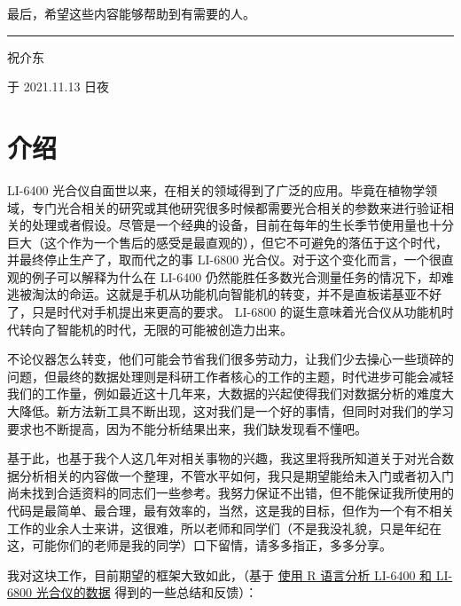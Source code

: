 \documentclass[
  letterpaper,
  DIV=11]{scrreport}
\begin{document}
最后，希望这些内容能够帮助到有需要的人。

\begin{center}\rule{0.5\linewidth}{0.5pt}\end{center}

祝介东

于 2021.11.13 日夜

\hypertarget{Introduction}{%
\chapter*{介绍}\label{Introduction}}

LI-6400
光合仪自面世以来，在相关的领域得到了广泛的应用。毕竟在植物学领域，专门光合相关的研究或其他研究很多时候都需要光合相关的参数来进行验证相关的处理或者假设。尽管是一个经典的设备，目前在每年的生长季节使用量也十分巨大（这个作为一个售后的感受是最直观的），但它不可避免的落伍于这个时代，并最终停止生产了，取而代之的事
LI-6800 光合仪。对于这个变化而言，一个很直观的例子可以解释为什么在
LI-6400
仍然能胜任多数光合测量任务的情况下，却难逃被淘汰的命运。这就是手机从功能机向智能机的转变，并不是直板诺基亚不好了，只是时代对手机提出来更高的要求。
LI-6800
的诞生意味着光合仪从功能机时代转向了智能机的时代，无限的可能被创造力出来。

不论仪器怎么转变，他们可能会节省我们很多劳动力，让我们少去操心一些琐碎的问题，但最终的数据处理则是科研工作者核心的工作的主题，时代进步可能会减轻我们的工作量，例如最近这十几年来，大数据的兴起使得我们对数据分析的难度大大降低。新方法新工具不断出现，这对我们是一个好的事情，但同时对我们的学习要求也不断提高，因为不能分析结果出来，我们缺发现看不懂吧。

基于此，也基于我个人这几年对相关事物的兴趣，我这里将我所知道关于对光合数据分析相关的内容做一个整理，不管水平如何，我只是期望能给未入门或者初入门尚未找到合适资料的同志们一些参考。我努力保证不出错，但不能保证我所使用的代码是最简单、最合理，最有效率的，当然，这是我的目标，但作为一个有不相关工作的业余人士来讲，这很难，所以老师和同学们（不是我没礼貌，只是年纪在这，可能你们的老师是我的同学）口下留情，请多多指正，多多分享。

我对这块工作，目前期望的框架大致如此，（基于
\href{https://zhujiedong.github.io/photoanalysis/}{使用 R 语言分析
LI-6400 和 LI-6800 光合仪的数据} 得到的一些总结和反馈）：
\end{document}
